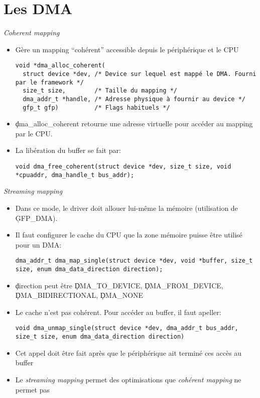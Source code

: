 \section{Les DMA}
 
\begin{frame}[fragile=singleslide]{\emph{Coherent mapping}}
  \begin{itemize}
  \item Gère un mapping ``cohérent'' accessible depuis le périphérique et le
    CPU
    \begin{lstlisting} 
void *dma_alloc_coherent(
  struct device *dev, /* Device sur lequel est mappé le DMA. Fourni par le framework */
  size_t size,        /* Taille du mapping */
  dma_addr_t *handle, /* Adresse physique à fournir au device */
  gfp_t gfp)          /* Flags habituels */
    \end{lstlisting} 
  \item  \c{dma_alloc_coherent} retourne  une adresse  virtuelle pour
    accéder au mapping par le CPU.
  \item La libération du buffer se fait par:
    \begin{lstlisting} 
void dma_free_coherent(struct device *dev, size_t size, void *cpuaddr, dma_handle_t bus_addr);
    \end{lstlisting} 
  \end{itemize} 
\end{frame} 

\begin{frame}[fragile=singleslide]{\emph{Streaming mapping}}
  \begin{itemize} 
  \item  Dans ce  mode, le  driver  doit allouer  lui-même la  mémoire
    (utilisation de \c{GFP_DMA}).
  \item Il faut configurer le cache  du CPU que la zone mémoire puisse
    être utilisé pour un DMA:
    \begin{lstlisting} 
dma_addr_t dma_map_single(struct device *dev, void *buffer, size_t size, enum dma_data_direction direction);
    \end{lstlisting} 
  \item \c{direction} peut être \c{DMA_TO_DEVICE},
    \c{DMA_FROM_DEVICE}, \c{DMA_BIDIRECTIONAL}, \c{DMA_NONE}
  \item Le cache  n'est pas cohérent. Pour accéder  au buffer, il faut
    apeller:
    \begin{lstlisting} 
void dma_unmap_single(struct device *dev, dma_addr_t bus_addr, size_t size, enum dma_data_direction direction)
    \end{lstlisting} 
  \item Cet appel doit être fait après que le périphérique ait terminé
    ces accès au buffer
  \item  Le  \emph{streaming  mapping}  permet des  optimisations  que
    \emph{cohérent mapping} ne permet pas
  \end{itemize}
\end{frame} 

